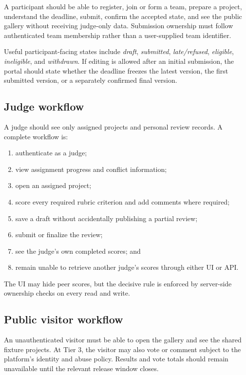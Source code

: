 \documentclass[11pt]{article}
\begin{document}
A participant should be able to register, join or form a team, prepare a project, understand the deadline, submit, confirm the accepted state, and see the public gallery without receiving judge-only data. Submission ownership must follow authenticated team membership rather than a user-supplied team identifier.

Useful participant-facing states include \emph{draft}, \emph{submitted}, \emph{late/refused}, \emph{eligible}, \emph{ineligible}, and \emph{withdrawn}. If editing is allowed after an initial submission, the portal should state whether the deadline freezes the latest version, the first submitted version, or a separately confirmed final version.

\subsection{Judge workflow}

A judge should see only assigned projects and personal review records. A complete workflow is:

\begin{enumerate}
  \item authenticate as a judge;
  \item view assignment progress and conflict information;
  \item open an assigned project;
  \item score every required rubric criterion and add comments where required;
  \item save a draft without accidentally publishing a partial review;
  \item submit or finalize the review;
  \item see the judge's own completed scores; and
  \item remain unable to retrieve another judge's scores through either UI or API\@.
\end{enumerate}

The UI may hide peer scores, but the decisive rule is enforced by server-side ownership checks on every read and write.

\subsection{Public visitor workflow}

An unauthenticated visitor must be able to open the gallery and see the shared fixture projects. At Tier 3, the visitor may also vote or comment subject to the platform's identity and abuse policy. Results and vote totals should remain unavailable until the relevant release window closes.
\end{document}
